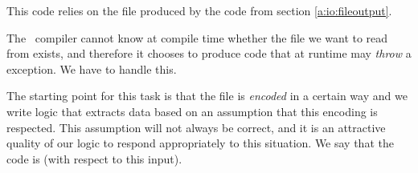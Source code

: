 \inputminted{csharp}{\context/answer/Months.cs}

This code relies on the  file produced by the code from section \ref{a:io:fileoutput}.

The \csharp\ compiler cannot know at compile time whether the file we want to read from exists, and therefore it chooses to produce code that at runtime may \textsl{throw} a  exception. We have to handle this.

The starting point for this task is that the file is \textsl{encoded} in a certain way and we write logic that extracts data based on an assumption that this encoding is respected. This assumption will not always be correct, and it is an attractive quality of our logic to respond appropriately to this situation. We say that the code is  (with respect to this input).
